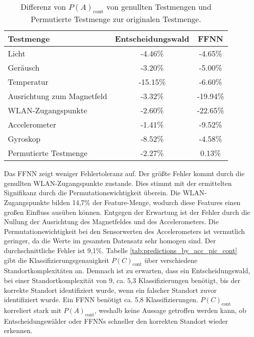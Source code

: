 \begin{table}[h!]
    \centering
    \begin{tabular}{ | l | c | c | }
        \hline
        Testmenge & Entscheidungswald & FFNN \\\hline
        Licht & -4.46\% & -4.65\% \\\hline
        Geräusch & -3.20\% & -5.00\% \\\hline
        Temperatur & -15.15\% & -6.60\% \\\hline
        Ausrichtung zum Magnetfeld & -3.32\% & -19.94\% \\\hline
        WLAN-Zugangspunkte & -2.60\% & -22.65\% \\\hline
        Accelerometer & -1.41\% & -9.52\% \\\hline
        Gyroskop & -8.52\% & -4.58\% \\\hline
        Permutierte Testmenge & -2.27\% & 0.13\% \\\hline
    \end{tabular}
    \caption{Differenz von $P(A)_{\text{cont}}$ von genullten Testmengen und Permutierte Testmenge zur originalen Testmenge.}
    \label{tab:robustness_by_acc_cont}
\end{table}
\newline
\newline
Das FFNN zeigt weniger Fehlertoleranz auf.
Der größte Fehler kommt durch die genullten WLAN-Zugangspunkte zustande.
Dies stimmt mit der ermittelten Signifikanz durch die Permutationswichtigkeit überein.
Die WLAN-Zugangspunkte bilden 14,7\% der Feature-Menge, wodurch diese Features einen großen Einfluss ausüben können.
\newline
Entgegen der Erwartung ist der Fehler durch die Nullung der Ausrichtung des Magnetfeldes und des Accelerometers.
Die Permutationswichtigkeit bei den Sensorwerten des Accelerometers ist vermutlich geringer,
da die Werte im gesamten Datensatz sehr homogen sind.
Der durchschnittliche Fehler ist 9,1\%.
\newline
\newline
Tabelle \ref{tab:predictions_by_acc_pic_cont} gibt die Klassifizierungsgenauigkeit $P(C)_{\text{cont}}$ über verschiedene Standortkomplexitäten an.
Demnach ist zu erwarten, dass ein Entscheidungswald, bei einer Standortkomplexität von 9, ca. 5,3 Klassifizierungen benötigt, bis der korrekte Standort identifiziert wurde,
wenn ein falscher Standort zuvor identifiziert wurde.
Ein FFNN benötigt ca. 5,8 Klassifizierungen.
$P(C)_{\text{cont}}$ korreliert stark mit $P(A)_{\text{cont}}$, weshalb keine Aussage getroffen werden kann, ob Entscheidungswälder oder FFNNs schneller den korrekten Standort wieder erkennen.
